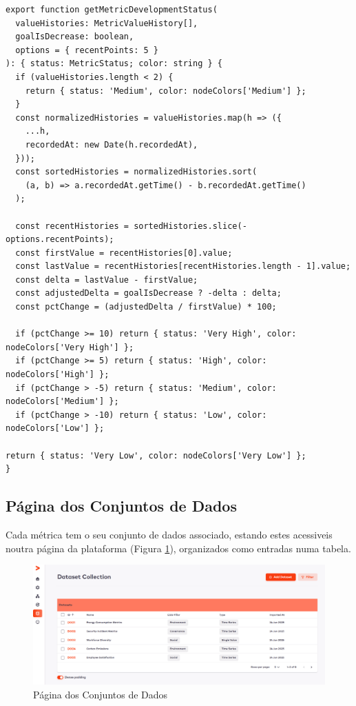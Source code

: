 \begin{lstlisting}[style=customts, caption={Função de Classificação de Progresso de uma Métrica}, label={lst:metric_classification}]
export function getMetricDevelopmentStatus(
  valueHistories: MetricValueHistory[],
  goalIsDecrease: boolean,
  options = { recentPoints: 5 }
): { status: MetricStatus; color: string } {
  if (valueHistories.length < 2) {
    return { status: 'Medium', color: nodeColors['Medium'] };
  }
  const normalizedHistories = valueHistories.map(h => ({
    ...h,
    recordedAt: new Date(h.recordedAt),
  }));
  const sortedHistories = normalizedHistories.sort(
    (a, b) => a.recordedAt.getTime() - b.recordedAt.getTime()
  );

  const recentHistories = sortedHistories.slice(-options.recentPoints);
  const firstValue = recentHistories[0].value;
  const lastValue = recentHistories[recentHistories.length - 1].value;
  const delta = lastValue - firstValue;
  const adjustedDelta = goalIsDecrease ? -delta : delta;
  const pctChange = (adjustedDelta / firstValue) * 100;

  if (pctChange >= 10) return { status: 'Very High', color: nodeColors['Very High'] };
  if (pctChange >= 5) return { status: 'High', color: nodeColors['High'] };
  if (pctChange > -5) return { status: 'Medium', color: nodeColors['Medium'] };
  if (pctChange > -10) return { status: 'Low', color: nodeColors['Low'] };
  
return { status: 'Very Low', color: nodeColors['Very Low'] };
}
\end{lstlisting}

\subsection{Página dos Conjuntos de Dados}

Cada métrica tem o seu conjunto de dados associado, estando estes acessiveis noutra página da plataforma (Figura \ref{fig:dataset_done}), organizados como entradas numa tabela.

\begin{figure}[H]
    \centering
    \includegraphics[width=\linewidth,keepaspectratio]{frontmatter/assets/platform_prints/dataset/dataset_done.png}
    \caption{Página dos Conjuntos de Dados}
    \label{fig:dataset_done}
\end{figure}

